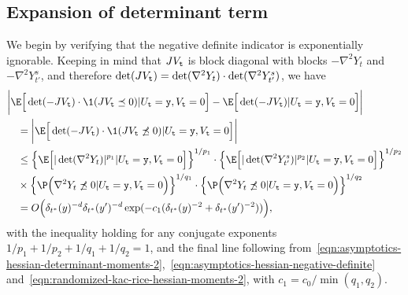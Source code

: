 \documentclass{article}
\begin{document}
	\subsection{Expansion of determinant term}
	We begin by verifying that the negative definite indicator is exponentially ignorable. Keeping in mind that $J V_{{\tt t}}$ is block diagonal with blocks $-\nabla^2 Y_t$ and $-\nabla^2 Y_{t'}^s$, and therefore $\det(J V_{{\tt t}}) = \det(\nabla^2 Y_t) \cdot \det(\nabla^2 Y_{t'}^s)$, we have
	\begin{equation}
		\label{pf:approximation-peak-intensity-1}
		\begin{aligned}
			& \bigg|\E\Big[\det(-J V_{\tt t}) \cdot \1(JV_{\tt t} \preceq 0)|U_{\tt t} = {\tt y},V_{\tt t} = 0\Big] - \E\Big[\det(-J V_{\tt t})|U_{\tt t} = {\tt y},V_{\tt t} = 0\Big]\bigg| \\
			& \quad = \bigg|\E\Big[\det(-J V_{\tt t}) \cdot \1(JV_{\tt t} \not\preceq 0)|U_{\tt t} = {\tt y},V_{\tt t} = 0\Big]\bigg| \\
			& \quad \leq \Big\{\E\Big[|\det(\nabla^2 Y_t)|^{p_1}|U_{\tt t} = {\tt y},V_{\tt t} = 0\Big]\Big\}^{1/p_1} \cdot \Big\{\E\Big[|\det(\nabla^2 Y_{t'}^s)|^{p_2}|U_{\tt t} = {\tt y},V_{\tt t} = 0\Big]\Big\}^{1/p_2} \\
			& \quad \times \Big\{\P\Big(\nabla^2 Y_{t} \not\preceq 0|U_{\tt t} = {\tt y},V_{\tt t} = 0\Big)\Big\}^{1/q_1} \cdot \Big\{\P\Big(\nabla^2 Y_{t} \not\preceq 0|U_{\tt t} = {\tt y},V_{\tt t} = 0\Big)\Big\}^{1/q_2} \\
			& \quad = O\Big(\delta_{t^*}(y)^{-d} \delta_{t^*}(y')^{-d} \exp(-c_1(\delta_{t^*}(y)^{-2} + \delta_{t^*}(y')^{-2}))\Big),
		\end{aligned}
	\end{equation}
	with the inequality holding for any conjugate exponents $1/p_1 + 1/p_2 + 1/q_1 + 1/q_2 = 1$, and the final line following from~\eqref{eqn:asymptotics-hessian-determinant-moments-2},~\eqref{eqn:asymptotics-hessian-negative-definite} and~\eqref{eqn:randomized-kac-rice-hessian-moments-2}, with $c_1 = c_0/\min(q_1,q_2)$. 
	
\end{document}
